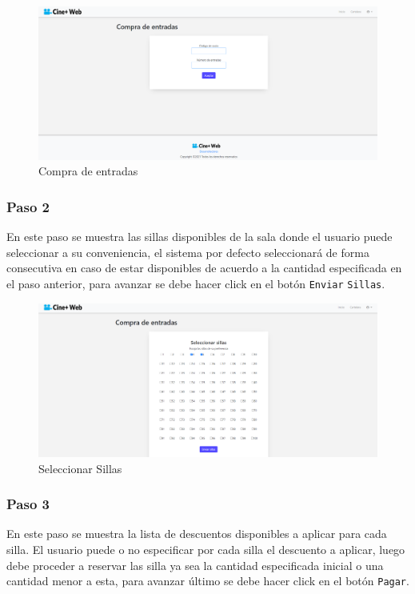 \begin{figure}[h!]
	\centering
	\includegraphics[scale=0.35]{./chapters/img/ticketpurchase1.png}
	
	\label{fig:ticketpurchase1}
	\caption{Compra de entradas}
	
\end{figure}

\subsubsection{Paso 2}
En este paso se muestra las sillas disponibles de la sala donde el usuario puede seleccionar a su conveniencia, el sistema por defecto seleccionar\'a de forma consecutiva en caso de estar disponibles de acuerdo a la cantidad especificada en el paso anterior, para avanzar se debe hacer click en el bot\'on \verb*|Enviar| \verb*|Sillas|.

\begin{figure}[h!]
	\centering
	\includegraphics[scale=0.35]{./chapters/img/seat.png}
	
	\label{fig:seats}
	\caption{Seleccionar Sillas}
\end{figure}

\subsubsection{Paso 3}
En este paso se muestra la lista de descuentos disponibles a aplicar para cada silla. El usuario puede o no especificar por cada silla el descuento a aplicar, luego debe proceder a reservar las silla ya sea la cantidad especificada inicial o una cantidad menor a esta, para avanzar \'ultimo se debe hacer click en el bot\'on \verb*|Pagar|.

